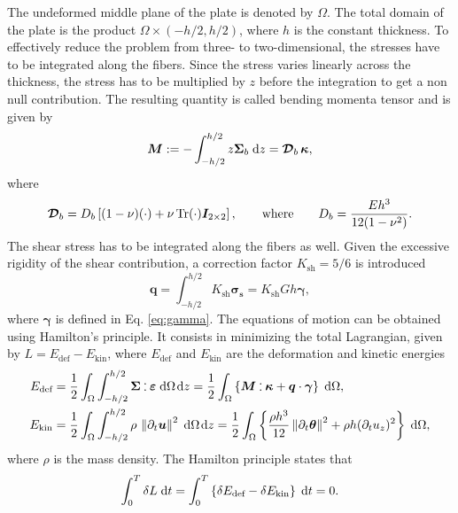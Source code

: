 The undeformed middle plane of the plate is denoted by $\Omega$. The total domain of the plate is the product $\Omega \times (-h/2, h/2)$, where $h$ is the constant thickness. To effectively reduce the problem from three- to two-dimensional, the stresses have to be integrated along the fibers. Since the stress varies linearly across the thickness, the stress has to be multiplied by $z$ before the integration to get a non null contribution. The resulting quantity is called bending momenta tensor and is given by 
\begin{equation}\label{eq:bend_momenta}
\bm{M} :=-\int_{-h/2}^{h/2} z \bm{\Sigma}_{b} \d{z} = \bm{\mathcal{D}}_{b} \, \bm{\kappa}, 
\end{equation}
where 
\begin{equation}\label{eq:Db}
\bm{\mathcal{D}}_{b} = D_b \left[ (1-\nu) (\cdot) + \nu \operatorname{Tr}(\cdot) \bm{I}_{2\times 2} \right], \qquad \text{where} \qquad D_b = \frac{E h^3}{12(1-\nu^2)}.
\end{equation}
The shear stress has to be integrated along the fibers as well. Given the excessive rigidity of the shear contribution, a correction factor $K_{\text{sh}}=5/6$ \cite[Chapter 10]{reddy2006theory} is introduced 
\begin{equation}\label{eq:shearstress}
\bm{q} = \int_{-h/2}^{h/2} K_{\text{sh}} \bm{\sigma_s} = K_{\text{sh}} Gh \bm{\gamma},
\end{equation}
where $\bm{\gamma}$ is defined in Eq. \eqref{eq:gamma}. The equations of motion can be obtained using Hamilton's principle. It consists in minimizing the total Lagrangian, given by $L = E_{\text{def}} - E_{\text{kin}}$, where $E_{\text{def}}$ and $E_{\text{kin}}$ are the deformation  and kinetic energies
\begin{align}
E_{\text{def}} &= \frac{1}{2} \int_{\Omega} \int_{-h/2}^{h/2} \bm{\Sigma} \cddot \bm{\varepsilon} \d{\Omega} \d{z} = \frac{1}{2} \int_{\Omega} \left\{\bm{M} \cddot \bm{\kappa} + \bm{q} \cdot \bm{\gamma} \right\} \d{\Omega}, \label{eq:defenMin}\\
E_{\text{kin}} &= \frac{1}{2}  \int_{\Omega} \int_{-h/2}^{h/2} \rho \,  \norm{\partial_t \bm{u}}^2 \d{\Omega} \d{z} = \frac{1}{2} \int_{\Omega} \left\{\frac{\rho h^3}{12} \norm{\partial_t \bm{\theta}}^2 + \rho h (\partial_t u_z)^2  \right\} \d{\Omega}, \label{eq:kinenMin}
\end{align}
where $\rho$ is the mass density. The Hamilton principle states that 
\begin{equation*}
\int_{0}^{T} \delta L \d{t} = \int_{0}^{T} \left\{ \delta E_{\text{def}} - \delta E_{\text{kin}} \right\} \d{t} = 0.
\end{equation*}
